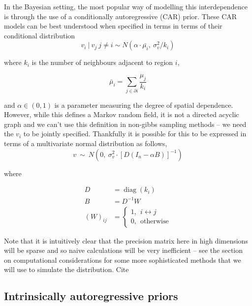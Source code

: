 \documentclass[11pt]{report}
\begin{document}
In the Bayesian setting, the most popular way of modelling this interdependence is through the use of a conditionally autoregressive (CAR) prior. These CAR models can be best understood when specified in terms in terms of their conditional distribution
\begin{equation}
v_i \ | \ v_j \ j \neq i \sim N(\alpha \cdot \bar{\mu_i}, \ \sigma_v^2/k_i)
\end{equation}

where $k_i$ is the number of neighbours adjacent to region $i$,

\begin{equation}
\bar{\mu}_i = \sum_{j \in \partial i} \frac{\mu_j}{k_i}
\end{equation}

and $\alpha \in (0, 1)$ is a parameter measuring the degree of spatial dependence. \\

However, while this defines a Markov random field, it is not a directed acyclic graph and we can't use this definition in non-gibbs sampling methods -- we need the $v_i$ to be jointly specified. Thankfully it is possible \citep{banerjeebook} for this to be expressed in terms of a multivariate normal distribution as follows,
\begin{equation} \label{eq:car}
v \ \sim \ N(0, \ \sigma_v^2 \cdot {[D(I_n - \alpha B)]}^{-1})
\end{equation}

where

\begin{align}
D &= \operatorname{diag}(k_i) \\
B &= D^{-1} W \\
{(W)}_{ij} &= 
\begin{cases}
1, \ \ i \leftrightarrow j \\
0, \ \ \textrm{otherwise}
\end{cases}
\end{align} 

Note that it is intuitively clear that the precision matrix here in high dimensions will be sparse and so naive calculations will be very inefficient -- see the section on computational considerations for some more sophisticated methods that we will use to simulate the distribution. Cite \citet{car}

\subsection{Intrinsically autoregressive priors}
\end{document}

